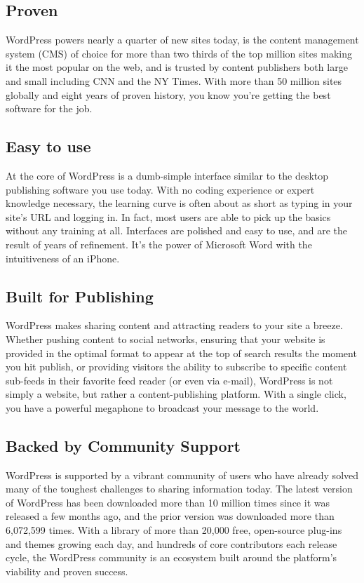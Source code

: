 \subsection{Proven}

WordPress powers nearly a quarter of new sites today, is the content management system (CMS) of choice for more than two thirds of the top million sites making it the most popular on the web, and is trusted by content publishers both large and small including CNN and the NY Times. With more than 50 million sites globally and eight years of proven history, you know you’re getting the best software for the job.

\subsection{Easy to use}

At the core of WordPress is a dumb-simple interface similar to the desktop publishing software you use today. With no coding experience or expert knowledge necessary, the learning curve is often about as short as typing in your site’s URL and logging in. In fact, most users are able to pick up the basics without any training at all. Interfaces are polished and easy to use, and are the result of years of refinement. It’s the power of Microsoft Word with the intuitiveness of an iPhone.

\subsection{Built for Publishing}

WordPress makes sharing content and attracting readers to your site a breeze. Whether pushing content to social networks, ensuring that your website is provided in the optimal format to appear at the top of search results the moment you hit publish, or providing visitors the ability to subscribe to specific content sub-feeds in their favorite feed reader (or even via e-mail), WordPress is not simply a website, but rather a content-publishing platform. With a single click, you have a powerful megaphone to broadcast your message to the world.

\subsection{Backed by Community Support}

WordPress is supported by a vibrant community of users who have already solved many of the toughest challenges to sharing information today. The latest version of WordPress has been downloaded more than 10 million times since it was released a few months ago, and the prior version was downloaded more than 6,072,599 times. With a library of more than 20,000 free, open-source plug-ins and themes growing each day, and hundreds of core contributors each release cycle, the WordPress community is an ecosystem built around the platform’s viability and proven success.

